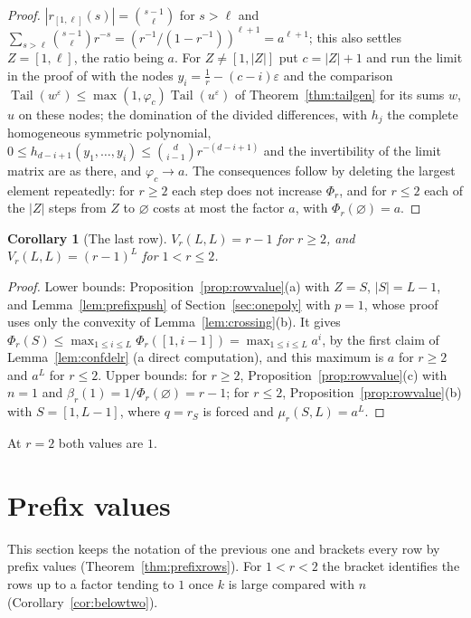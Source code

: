 \documentclass[11pt]{article}
\newtheorem{corollary}[theorem]{Corollary}
\DeclareMathOperator{\Tail}{Tail}
\begin{document}
\begin{proof}
$|r_{[1,\ell]}(s)|=\binom{s-1}\ell$ for $s>\ell$ and
$\sum_{s>\ell}\binom{s-1}\ell r^{-s}=(r^{-1}/(1-r^{-1}))^{\ell+1}=a^{\ell+1}$;
this also settles $Z=[1,\ell]$, the ratio being $a$.  For
$Z\ne[1,|Z|]$ put $c=|Z|+1$ and run the limit in the proof of
\cite[Lemma~4.6]{coefficient-mass} with
the nodes $y_i=\frac1r-(c-i)\varepsilon$ and the comparison
$\Tail(w^\varepsilon)\le\max(1,\varphi_c)\Tail(u^\varepsilon)$ of
Theorem~\ref{thm:tailgen} for its sums $w$, $u$ on these nodes; the
domination of the divided differences, with $h_j$ the complete homogeneous
symmetric polynomial,
$0\le h_{d-i+1}(y_1,\ldots,y_i)\le\binom d{i-1}r^{-(d-i+1)}$ and the
invertibility of the limit matrix are as there, and $\varphi_c\to a$.  The
consequences follow by deleting the largest element repeatedly: for $r\ge2$
each step does not increase $\Phi_r$, and for $r\le2$ each of the $|Z|$
steps from $Z$ to $\varnothing$ costs at most the factor $a$, with
$\Phi_r(\varnothing)=a$.
\end{proof}

\begin{corollary}[The last row]\label{cor:lastrowr}
$V_r(L,L)=r-1$ for $r\ge2$, and $V_r(L,L)=(r-1)^L$ for $1<r\le2$.
\end{corollary}

\begin{proof}
Lower bounds: Proposition~\ref{prop:rowvalue}(a) with $Z=S$, $|S|=L-1$, and
Lemma~\ref{lem:prefixpush} of Section~\ref{sec:onepoly} with $p=1$, whose
proof uses only the convexity of Lemma~\ref{lem:crossing}(b).  It gives
$\Phi_r(S)\le\max_{1\le i\le L}\Phi_r([1,i-1])=\max_{1\le i\le L}a^i$, by
the first claim of Lemma~\ref{lem:confdelr} (a direct computation), and
this maximum is $a$ for $r\ge2$ and $a^L$ for $r\le2$.  Upper bounds: for $r\ge2$,
Proposition~\ref{prop:rowvalue}(c) with $n=1$ and
$\beta_r(1)=1/\Phi_r(\varnothing)=r-1$; for $r\le2$, Proposition~\ref{prop:rowvalue}(b)
with $S=[1,L-1]$, where $q=r_S$ is forced and $\mu_r(S,L)=a^L$.
\end{proof}

At $r=2$ both values are $1$.

\section{Prefix values}\label{sec:prefix}

This section keeps the notation of the previous one and brackets every row
by prefix values (Theorem~\ref{thm:prefixrows}).  For $1<r<2$ the bracket
identifies the rows up to a factor tending to $1$ once $k$ is large
compared with $n$ (Corollary~\ref{cor:belowtwo}).
\end{document}
